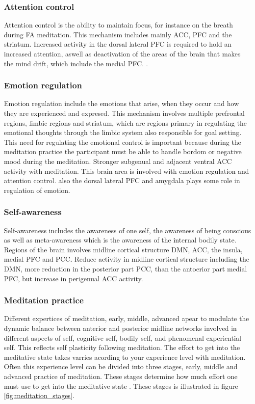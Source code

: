 \subsubsection{Attention control}
Attention control is the ability to maintain focus, for instance on the breath during FA meditation. This mechanism includes mainly ACC, PFC and the striatum. 
Increased activity in the dorsal lateral PFC is required to hold an increased attention, aswell as deactivation of the areas of the brain that makes the mind drift, which include the medial PFC. \cite{Tang2017}.

\subsubsection{Emotion regulation}
Emotion regulation include the emotions that arise, when they occur and how they are experienced and expresed. This mechanism involves multiple prefrontal regions, limbic regions and striatum, which are regions primary in regulating the emotional thoughts through the limbic system also responsible for goal setting. This need for regulating the emotional control is important because during the meditation practice the participant must be able to handle bordom or negative mood during the meditation. Stronger subgenual and adjacent ventral ACC activity with meditation. This brain area is involved with emotion regulation and attention control. also the dorsal lateral PFC and amygdala plays some role in regulation of emotion. 

\subsubsection{Self-awareness}
Self-awareness includes the awareness of one self, the awareness of being conscious as well as meta-awareness which is the awareness of the internal bodily state. Regions of the brain involves midline cortical structure DMN, ACC, the insula, medial PFC and PCC. Reduce activity in midline cortical structure including the DMN, more reduction in the posterior part PCC, than the antoerior part medial PFC, but increase in perigenual ACC activity.

\subsubsection{Meditation practice}
Different expertices of meditation, early, middle, advanced apear to modulate the dynamic balance between anterior and posterior midline networks involved in different aspects of self, cognitive self, bodily self, and phenomenal experiential self. This reflects self plasticity following meditation. 
The effort to get into the meditative state takes varries acording to your experience level with meditation. Often this experience level can be divided into three stages, early, middle and advanced practice of meditation. These stages determine how much effort one must use to get into the meditative state \cite{Tang2017}. These stages is illustrated in figure \ref{fig:meditation_stages}.

